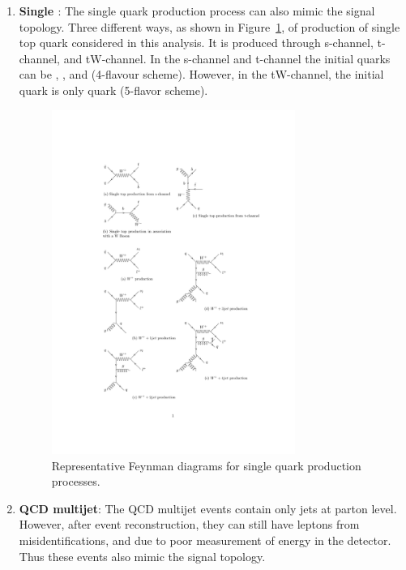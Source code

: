 \begin{enumerate}
\item {\bf{Single \PQt}}: The single \PQt quark production process can also mimic the signal 
	topology. Three different ways, as shown in Figure~\ref{fig:feyn_diag_st}, 
	of production of single top quark considered in this analysis. It is produced through 
	s-channel, t-channel, and tW-channel. In the s-channel and t-channel the initial quarks 
	can be \PQu, \PQd, \PQc and \PQs (4-flavour scheme). However, in the tW-channel, 
	the initial quark is only \PQb quark (5-flavor scheme).
	\begin{figure}
	\begin{center}
	\includegraphics[width=0.75\textwidth]{Image/FeynDiag/feyn_diag_st.pdf}
	\caption{Representative Feynman diagrams for single \PQt quark production processes.}
	\label{fig:feyn_diag_st}
	\end{center}
	\end{figure}

\item {\bf{QCD multijet}}: The QCD multijet events contain only jets 
    at parton level. However, after event reconstruction, they can 
    still have leptons from misidentifications, and \MET due to poor 
    measurement of energy in the detector. Thus these events also 
    mimic the signal topology.


\end{enumerate}
